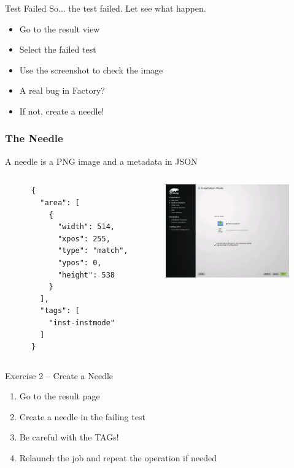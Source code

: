 \documentclass{beamer}
\begin{document}
%
%
\begin{frame}{Test Failed}
  So... the test failed. Let see what happen.
  \begin{itemize}
  \item Go to the result view
  \item Select the failed test
  \item Use the screenshot to check the image
  \item A real bug in Factory?
  \item If not, create a needle!
  \end{itemize}
\end{frame}

%
%
\begin{frame}[fragile]
  \frametitle{The Needle}
  A needle is a PNG image and a metadata in JSON
  \begin{columns}
    \begin{column}{0.45\textwidth}
    \lstset{style=mybash}
    \begin{lstlisting}
      {
        "area": [
          {
            "width": 514,
            "xpos": 255,
            "type": "match",
            "ypos": 0,
            "height": 538
          }
        ],
        "tags": [
          "inst-instmode"
        ]
      }
    \end{lstlisting}
    \end{column}

    \begin{column}{0.45\textwidth}
      \includegraphics[height=4cm,width=5.33cm]{needle}
    \end{column}
  \end{columns}
\end{frame}

%
%
\begin{frame}{Exercise 2 -- Create a Needle}
  \begin{enumerate}
  \item Go to the result page
  \item Create a needle in the failing test
  \item Be careful with the TAGs!
  \item Relaunch the job and repeat the operation if needed
  \end{enumerate}
\end{frame}
\end{document}
